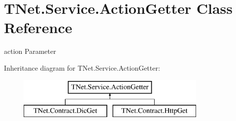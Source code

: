 \hypertarget{class_t_net_1_1_service_1_1_action_getter}{}\section{T\+Net.\+Service.\+Action\+Getter Class Reference}
\label{class_t_net_1_1_service_1_1_action_getter}


action Parameter  


Inheritance diagram for T\+Net.\+Service.\+Action\+Getter\+:\begin{figure}[H]
\begin{center}
\leavevmode
\includegraphics[height=2.000000cm]{class_t_net_1_1_service_1_1_action_getter}
\end{center}
\end{figure}
